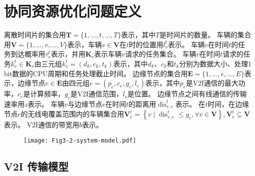 \section{协同资源优化问题定义}\label{section 3-3}

离散时间片的集合用$\mathbf{T}=\{1, \ldots, t, \ldots, T\}$表示，其中$T$是时间片的数量。
车辆的集合用$\mathbf{V}=\{1, \ldots, v, \ldots, V\}$表示，车辆$v \in \mathbf{V}$在$t$时的位置用$l_{v}^{t}$表示。
车辆$v$在时间$t$的任务到达概率用$\tau_{v}^{t}$表示，并用$\mathbf{K}_{v}$表示车辆$v$请求的任务集合。
车辆$v$在时间$t$请求的任务$k_{v}^{t} \in \mathbf{K}_{v}$由三元组$k_{v}^{t}=\left(d_{k}, c_{k}, t_{k}\right)$表示，其中$d_{k}$、$c_{k}$和$t_{k}$分别为数据大小、处理1 bit数据的CPU周期和任务处理截止时间。
边缘节点的集合用$\mathbf{E}=\{1, \ldots, e, \ldots, E\}$表示，边缘节点$e \in \mathbf{E}$由四元组$e=\left(p_{e}, c_{e}, g_{e}, l_{e}\right)$表示，其中$p_{e}$是V2I通信的最大功率，$c_{e}$是计算频率，$g_e$是V2I通信范围，$l_{e}$是位置。
边缘节点之间有线通信的传输速率用$z$表示。
车辆$v$与边缘节点$e$在时间$t$的距离用$\operatorname{dis}_{v, e}^{t}$表示。
在$t$时间，在边缘节点$e$的无线电覆盖范围内的车辆集合用$\mathbf{V}_{e}^{t}=\left\{v \mid \operatorname{dis}_{v, e}^{t} \leq g_{e}, \forall v \in \mathbf{V}\right\}, \mathbf{V}_{e}^{t} \subseteq \mathbf{V}$表示。
V2I通信的带宽用$b$表示。

\begin{figure}[h]
\centering
  \texttt{[image: Fig3-2-system-model.pdf]}
  \label{fig 3-2}
\end{figure}

\subsection{V2I 传输模型}


